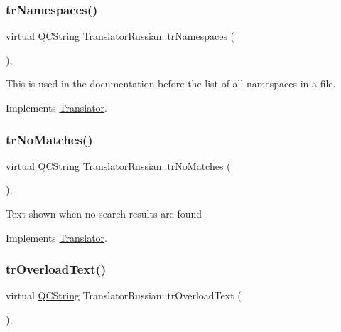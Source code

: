 \subsubsection{\texorpdfstring{trNamespaces()}{trNamespaces()}}
{\footnotesize\ttfamily virtual \mbox{\hyperlink{class_q_c_string}{Q\+C\+String}} Translator\+Russian\+::tr\+Namespaces (\begin{DoxyParamCaption}{ }\end{DoxyParamCaption})\hspace{0.3cm}{\ttfamily [inline]}, {\ttfamily [virtual]}}

This is used in the documentation before the list of all namespaces in a file. 

Implements \mbox{\hyperlink{class_translator}{Translator}}.

\mbox{\label{class_translator_russian_aed7f07d2f1f5c008c5754fe46351eec6}} 
\subsubsection{\texorpdfstring{trNoMatches()}{trNoMatches()}}
{\footnotesize\ttfamily virtual \mbox{\hyperlink{class_q_c_string}{Q\+C\+String}} Translator\+Russian\+::tr\+No\+Matches (\begin{DoxyParamCaption}{ }\end{DoxyParamCaption})\hspace{0.3cm}{\ttfamily [inline]}, {\ttfamily [virtual]}}

Text shown when no search results are found 

Implements \mbox{\hyperlink{class_translator}{Translator}}.

\mbox{\label{class_translator_russian_a58485b22a2c9a01ec7327b021ebc5aa1}} 
\subsubsection{\texorpdfstring{trOverloadText()}{trOverloadText()}}
{\footnotesize\ttfamily virtual \mbox{\hyperlink{class_q_c_string}{Q\+C\+String}} Translator\+Russian\+::tr\+Overload\+Text (\begin{DoxyParamCaption}{ }\end{DoxyParamCaption})\hspace{0.3cm}{\ttfamily [inline]}, {\ttfamily [virtual]}}

